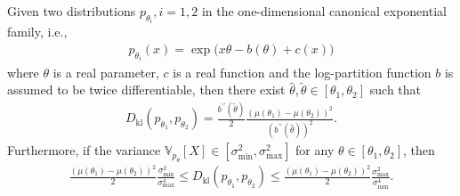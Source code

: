\documentclass[twoside,11pt]{article}
\newcommand{\kl}{D_{\mathrm{kl}}}
\newcommand{\bbV}{\mathbb{V}}
\begin{document}
\begin{lemma}\label{lem:klvsgap}
    Given two distributions $p_{\theta_i},i=1,2$ in the one-dimensional canonical exponential family, i.e.,
    \begin{align}
        p_{\theta_i}(x) = \exp\big(
                x\theta-b(\theta)+c(x)
            \big)
    \end{align}
    where $\theta$ is a real parameter, $c$ is a real function and the log-partition function $b$ is assumed to be twice differentiable,
    then there exist $\hat{\theta},\tilde{\theta}\in[\theta_1,\theta_2]$ such that
    \begin{align}
        \kl(p_{\theta_1},p_{\theta_2}) 
        =
        \frac{b^{\prime\prime}(\tilde{\theta})}{2} \frac{(\mu(\theta_1)-\mu(\theta_2))^2}{(b^{\prime\prime}(\hat{\theta}))^2}.
    \end{align}
    Furthermore, if the variance $\bbV_{p_\theta}[X]\in [\sigma_{\min}^2,\sigma_{\max}^2]$ for any $\theta\in[\theta_1,\theta_2]$, then
    \begin{align}
        \frac{(\mu(\theta_1)-\mu(\theta_2))^2}{2} \frac{\sigma_{\min}^2}{\sigma_{\max}^4} 
        \leq
        \kl(p_{\theta_1},p_{\theta_2}) 
        \leq
        \frac{(\mu(\theta_1)-\mu(\theta_2))^2}{2} \frac{\sigma_{\max}^2}{\sigma_{\min}^4} .
    \end{align}
\end{lemma}
\end{document}
